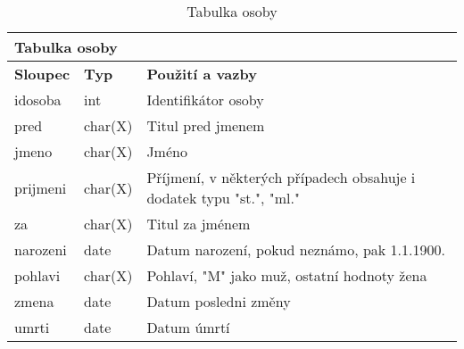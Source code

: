 \begin{center}
	\begin{longtable}{|l|l|p{9cm}|}
		\caption{Tabulka osoby
		} \label{table:osoby} \\
		
		\hline 
		
		\multicolumn{3}{|l|}{\textbf{Tabulka osoby
		}} \\
		
		\hline 
		
		\multicolumn{1}{|l|}{\textbf{Sloupec}} & \multicolumn{1}{l|}{\textbf{Typ}} & \multicolumn{1}{l|}{\textbf{Použití a vazby}} \\ 
		
		\endhead
		
		\hline 
		
		id\textunderscore osoba & int & Identifikátor osoby \\
		
		\hline 
		
		pred & char(X) & Titul pred jmenem \\
	
		\hline 
		
		jmeno & char(X) & Jméno \\
		
		\hline 
		
		prijmeni & char(X) & Příjmení, v některých případech obsahuje i dodatek typu "st.", "ml." \\
		
		\hline 
		
		za & char(X) & Titul za jménem \\
		
		\hline 
		
		narozeni & date & Datum narození, pokud neznámo, pak 1.1.1900. \\
		
		\hline 

		pohlavi & char(X) & Pohlaví, "M" jako muž, ostatní hodnoty žena \\
		
		\hline 
		
		zmena & date & Datum posledni změny \\
		
		\hline 
		
		umrti & date & Datum úmrtí \\
		
		\hline 
		
		
	\end{longtable}
\end{center}

